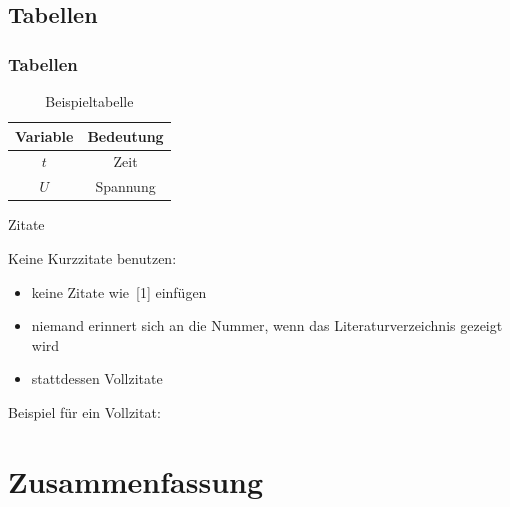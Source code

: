 \documentclass[aspectratio=3218]{beamer}
\begin{document}
\subsection{Tabellen}

\begin{frame}
	\frametitle<presentation>{Tabellen}
	\begin{table}
		\caption{Beispieltabelle}
		\label{tab:beispiel}
		\centering
			\begin{tabular}{cc}
				\toprule
				Variable & Bedeutung \\
				\midrule
				$t$ & Zeit \\
				$U$ & Spannung \\
				\bottomrule
			\end{tabular}
	\end{table}
\end{frame}

\begin{frame}{Zitate}
	\begin{block}{Keine Kurzzitate benutzen:}
		\begin{itemize}
			\item keine Zitate wie~[1] einfügen
			\item niemand erinnert sich an die Nummer, wenn das Literaturverzeichnis gezeigt wird
			\item stattdessen Vollzitate
		\end{itemize}
	\end{block}
	\begin{block}{Beispiel für ein Vollzitat:}
		\small{}
	\end{block}
\end{frame}

\section{Zusammenfassung}

\subsection*{}
\end{document}
